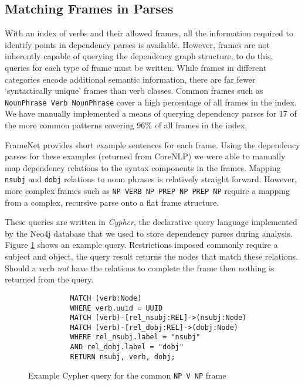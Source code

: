     \tocless\subsection{Matching Frames in Parses}
      With an index of verbs and their allowed frames, all the information required to identify points in dependency parses is available. However, frames are not inherently capable of querying the dependency graph structure, to do this, queries for each type of frame must be written. While frames in different categories encode additional semantic information, there are far fewer `syntactically unique' frames than verb classes. Common frames such as \texttt{NounPhrase Verb NounPhrase} cover a high percentage of all frames in the index. We have manually implemented a means of querying dependency parses for 17 of the more common patterns covering 96\% of all frames in the index.

      FrameNet provides short example sentences for each frame. Using the dependency parses for these examples (returned from CoreNLP) we were able to manually map dependency relations to the syntax components in the frames. Mapping \texttt{nsubj} and \texttt{dobj} relations to noun phrases is relatively straight forward. However, more complex frames such as \texttt{NP VERB NP PREP NP PREP NP} require a mapping from a complex, recursive parse onto a flat frame structure.

      These queries are written in \textit{Cypher}, the declarative query language implemented by the Neo4j database that we used to store dependency parses during analysis. Figure \ref{fig:npvnpquery} shows an example query. Restrictions imposed commonly require a subject and object, the query result returns the nodes that match these relations. Should a verb \textit{not} have the relations to complete the frame then nothing is returned from the query.

      \begin{figure}
        \centering
        \caption{Example Cypher query for the common \texttt{NP V NP} frame}

        \begin{lstlisting}
          MATCH (verb:Node)
          WHERE verb.uuid = UUID
          MATCH (verb)-[rel_nsubj:REL]->(nsubj:Node)
          MATCH (verb)-[rel_dobj:REL]->(dobj:Node)
          WHERE rel_nsubj.label = "nsubj"
          AND rel_dobj.label = "dobj"
          RETURN nsubj, verb, dobj;
        \end{lstlisting}
        \label{fig:npvnpquery}
      \end{figure}

